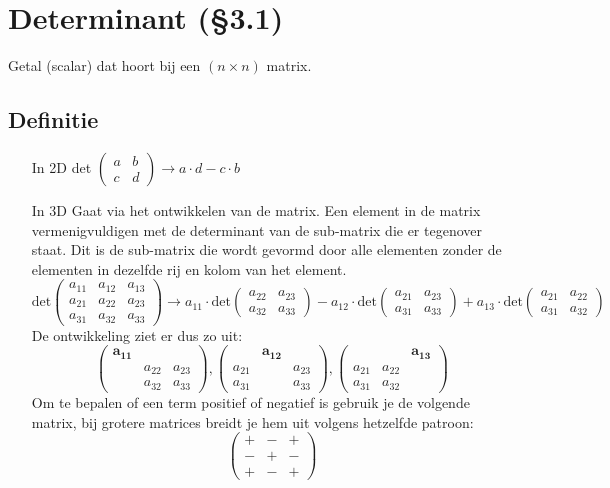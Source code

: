 \section{Determinant (\S3.1)}
Getal (scalar) dat hoort bij een $(n \times n)$ matrix.

\subsection{Definitie}
\begin{enumerate}
	\item[In 2D] det $\begin{pmatrix} a & b \\ c & d \end{pmatrix} \to a \cdot d - c \cdot b$

	\item[In 3D] Gaat via het ontwikkelen van de matrix.  Een element in de matrix vermenigvuldigen met de determinant van de sub-matrix die er tegenover staat. Dit is de sub-matrix die wordt gevormd door alle elementen zonder de elementen in dezelfde rij en kolom van het element.
	\[\mbox{det} \begin{pmatrix}
		a_{11} & a_{12} & a_{13} \\
		a_{21} & a_{22} & a_{23} \\
		a_{31} & a_{32} & a_{33}
	\end{pmatrix} \to a_{11} \cdot \mbox{det} \begin{pmatrix} a_{22} & a_{23} \\ a_{32} & a_{33} \end{pmatrix} - a_{12} \cdot \mbox{det} \begin{pmatrix} a_{21} & a_{23} \\ a_{31} & a_{33} \end{pmatrix} + a_{13} \cdot \mbox{det} \begin{pmatrix} a_{21} & a_{22} \\ a_{31} & a_{32} \end{pmatrix}\]
	De ontwikkeling ziet er dus zo uit:
	\[ \begin{pmatrix}
		\mathbf{a_{11}} && \\
		& a_{22} & a_{23} \\
		& a_{32} & a_{33}
	\end{pmatrix}, \begin{pmatrix}
		& \mathbf{a_{12}} & \\
		a_{21} && a_{23} \\
		a_{31} && a_{33}
	\end{pmatrix}, \begin{pmatrix}
		&& \mathbf{a_{13}} \\
		a_{21} & a_{22} & \\
		a_{31} & a_{32} &
	\end{pmatrix}\]
	Om te bepalen of een term positief of negatief is gebruik je de volgende matrix, bij grotere matrices breidt je hem uit volgens hetzelfde patroon:
	\[ \begin{pmatrix}
		+ & - & + \\
		- & + & - \\
		+ & - & +
	\end{pmatrix}\]
	

\end{enumerate}

